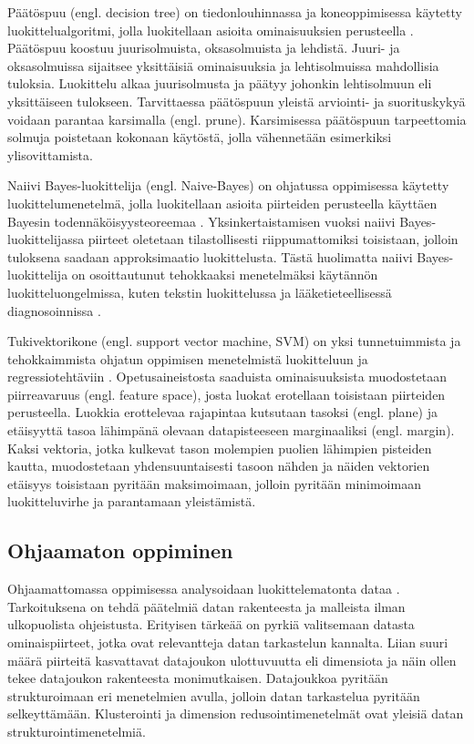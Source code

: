 \documentclass[utf8]{gradu3}
\begin{document}
Päätöspuu (engl. decision tree) on tiedonlouhinnassa ja koneoppimisessa käytetty luokittelualgoritmi, jolla luokitellaan asioita ominaisuuksien perusteella \parencite{nasteski2017overview,osisanwo2017supervised}. Päätöspuu koostuu juurisolmuista, oksasolmuista ja lehdistä. Juuri- ja oksasolmuissa sijaitsee yksittäisiä ominaisuuksia ja lehtisolmuissa mahdollisia tuloksia. Luokittelu alkaa juurisolmusta ja päätyy johonkin lehtisolmuun eli yksittäiseen tulokseen. Tarvittaessa päätöspuun yleistä arviointi- ja suorituskykyä voidaan parantaa karsimalla (engl. prune). Karsimisessa päätöspuun tarpeettomia solmuja poistetaan kokonaan käytöstä, jolla vähennetään esimerkiksi ylisovittamista.

Naiivi Bayes-luokittelija (engl. Naive-Bayes) on ohjatussa oppimisessa käytetty luokittelumenetelmä, jolla luokitellaan asioita piirteiden perusteella käyttäen Bayesin todennäköisyysteoreemaa \parencite{nasteski2017overview,rish2001empirical}. Yksinkertaistamisen vuoksi naiivi Bayes-luokittelijassa piirteet oletetaan tilastollisesti riippumattomiksi toisistaan, jolloin tuloksena saadaan approksimaatio luokittelusta. Tästä huolimatta naiivi Bayes-luokittelija on osoittautunut tehokkaaksi menetelmäksi käytännön luokitteluongelmissa, kuten tekstin luokittelussa ja lääketieteellisessä diagnosoinnissa \parencite{rish2001empirical}.

Tukivektorikone (engl. support vector machine, SVM) on yksi tunnetuimmista ja tehokkaimmista ohjatun oppimisen menetelmistä luokitteluun ja regressiotehtäviin \parencite{cervantes2020comprehensive,osisanwo2017supervised}. Opetusaineistosta saaduista ominaisuuksista muodostetaan piirreavaruus (engl. feature space), josta luokat erotellaan toisistaan piirteiden perusteella. Luokkia erottelevaa rajapintaa kutsutaan tasoksi (engl. plane) ja etäisyyttä tasoa lähimpänä olevaan datapisteeseen marginaaliksi (engl. margin). Kaksi vektoria, jotka kulkevat tason molempien puolien lähimpien pisteiden kautta, muodostetaan yhdensuuntaisesti tasoon nähden ja näiden vektorien etäisyys toisistaan pyritään maksimoimaan, jolloin pyritään minimoimaan luokitteluvirhe ja parantamaan yleistämistä.

\subsection{Ohjaamaton oppiminen}

Ohjaamattomassa oppimisessa analysoidaan luokittelematonta dataa \parencite{das2017survey,jordan2015machine}. Tarkoituksena on tehdä päätelmiä datan rakenteesta ja malleista ilman ulkopuolista ohjeistusta. Erityisen tärkeää on pyrkiä valitsemaan datasta ominaispiirteet, jotka ovat relevantteja datan tarkastelun kannalta. Liian suuri määrä piirteitä kasvattavat datajoukon ulottuvuutta eli dimensiota ja näin ollen tekee datajoukon rakenteesta monimutkaisen. Datajoukkoa pyritään strukturoimaan eri menetelmien avulla, jolloin datan tarkastelua pyritään selkeyttämään. Klusterointi ja dimension redusointimenetelmät ovat yleisiä datan strukturointimenetelmiä.
\end{document}
